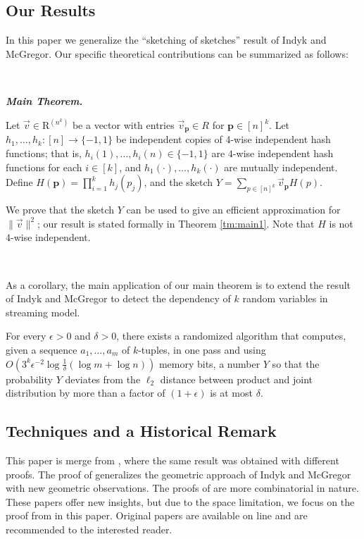 \def\draft{0}  \documentclass[proceedings]{stacs}
\theoremstyle{plain}\newtheorem{satz}[thm]{Satz}
\theoremstyle{definition}\newtheorem{crucial}[thm]{Crucial Definition}
\newcommand{\vecv}{{\vec{v}} }
\newcommand{\bfp}{{\mathbf p} }
\begin{document}
\subsection{Our Results}
In this paper we generalize the ``sketching of sketches''
result of Indyk and McGregor.
Our specific theoretical contributions can be summarized as follows:

\ \

\noindent
\emph{\textbf{Main Theorem. }}


\noindent
Let $\vecv \in \mathrm R^{(n^k)}$ be a vector with entries $\vecv_{\bfp} \in R$ for $\bfp \in [n]^k$.
Let $h_1,\dots,h_k:[n] \rightarrow \{-1, 1\}$ be independent copies of 4-wise independent hash functions;  that is, $h_i(1),\dots,h_i(n) \in \{-1,1\}$ are $4$-wise independent hash functions for each $i\in[k]$, and $h_1(\cdot),\dots,h_k(\cdot)$ are mutually independent.  Define $H(\bfp) = \prod_{i =1}^k h_j(p_j)$, and the sketch $Y = \sum_{p\in [n]^k} \vec v_{\mathbf p} H(p)$.

We prove that the sketch $Y$ can be used to give an efficient approximation for $\|\vecv\|^2$; our result is stated formally in Theorem \ref{tm:main1}. Note that $H$ is not $4$-wise independent.

\ \ \



As a corollary, the main application of our main theorem is to extend the result of Indyk and McGregor \cite{IM08} to detect the dependency of $k$ random variables in streaming model.

\begin{corollary}
For every $\epsilon > 0$ and $\delta > 0$, there exists a randomized algorithm that computes,
given a sequence $a_1, \dots, a_m$ of $k$-tuples, in one pass and using
$O(3^k\epsilon^{-2}\log \frac 1 \delta(\log m + \log n))$ memory bits,
a number $Y$ so that the probability $Y$ deviates from the $\ell_2$
distance between product and joint distribution by more than a factor of
$(1+\epsilon)$ is at most $\delta$.
\end{corollary}

\subsection{Techniques and a Historical Remark}

This paper is merge from \cite{BO01, BO02, CLM}, where the same result was obtained with different
proofs. The proof of \cite{CLM} generalizes the geometric approach of
Indyk and McGregor \cite{IM08} with new geometric observations.  The
proofs of \cite{BO01,BO02} are more combinatorial in nature. These papers
offer new insights, but due to the space limitation, we focus
on the proof from \cite{BO02} in this paper. Original papers are
available on line and are recommended to the interested reader.
\end{document}
